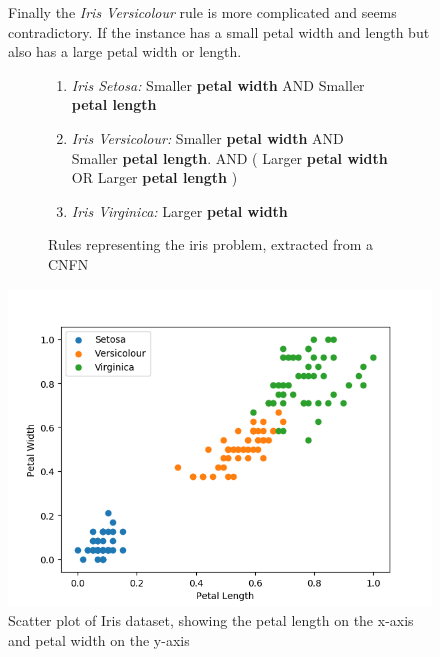 \begin{figure}[H]
	\centering

	\begin{minipage}[p]{0.51\textwidth}
	 Finally the \textit{Iris Versicolour} rule is more complicated and seems contradictory. If the instance has a small petal width and length but also has a large petal width or length.
	 \begin{figure}[H]
	 	\begin{enumerate}
	 		\item \textit{Iris Setosa: } Smaller \textbf{petal width} AND Smaller \textbf{petal length}
	 		\item \textit{Iris Versicolour: } Smaller \textbf{petal width} AND Smaller \textbf{petal length}. AND ( Larger \textbf{petal width} OR Larger \textbf{petal length} )
	 		\item \textit{Iris Virginica: } Larger \textbf{petal width}
	 	\end{enumerate}
 		\caption{Rules representing the iris problem, extracted from a CNFN}
 		\label{fig:iris-rules}
	 \end{figure}
	\end{minipage}
	\hspace{4px}
	\begin{minipage}[p]{0.45\textwidth}
		\includegraphics[width=\textwidth]{IrisData(petal(length-vs-width)).png}
		\caption{Scatter plot of Iris dataset, showing the petal length on the x-axis and petal width on the y-axis}
		\label{fig:iris-data-petal-length-vs-width}
	\end{minipage}
	\hfill
\end{figure}

